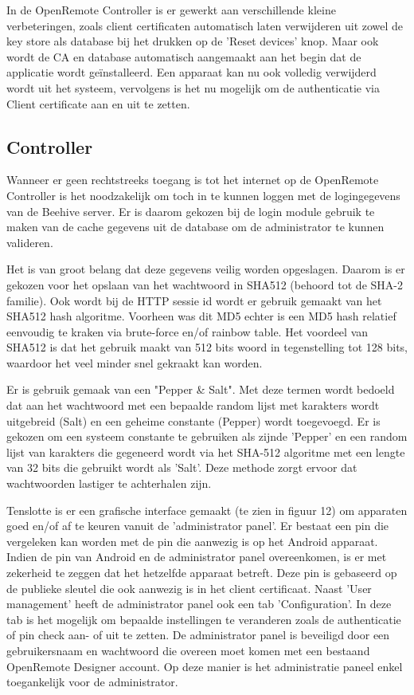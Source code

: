 \documentclass[]{article}
\begin{document}
In de OpenRemote Controller is er gewerkt aan verschillende kleine
verbeteringen, zoals client certificaten automatisch laten verwijderen uit zowel
de key store als database bij het drukken op de 'Reset devices' knop. Maar ook
wordt de CA en database automatisch aangemaakt aan het begin dat de applicatie
wordt ge\"installeerd.  Een apparaat kan nu ook volledig verwijderd wordt uit het
systeem, vervolgens is het nu mogelijk om de authenticatie via Client
certificate aan en uit te zetten. 

\subsection{Controller}
Wanneer er geen rechtstreeks toegang is tot het internet op de 
OpenRemote Controller is het noodzakelijk om toch in te kunnen loggen met de
logingegevens van de Beehive server. Er is daarom gekozen bij de login module
gebruik te maken van de cache gegevens uit de database om de administrator te
kunnen valideren.

Het is van groot belang dat deze gegevens veilig worden opgeslagen. Daarom is er
gekozen voor het opslaan van het wachtwoord in SHA512 (behoord tot de SHA-2
familie). Ook wordt bij de HTTP sessie id  wordt er gebruik gemaakt van het SHA512
hash algoritme. Voorheen was dit MD5 echter is een MD5 hash relatief
eenvoudig te kraken via brute-force en/of rainbow table. Het voordeel van SHA512
is dat het gebruik maakt van 512 bits woord in tegenstelling tot 128
bits, waardoor het veel minder snel gekraakt kan worden.

Er is gebruik gemaak van een "Pepper \& Salt". Met deze termen wordt bedoeld dat
aan het wachtwoord met een bepaalde random lijst met karakters wordt uitgebreid
(Salt) en een geheime constante (Pepper) wordt toegevoegd. Er is gekozen om een
systeem constante te gebruiken als zijnde 'Pepper' en een random lijst van
karakters die gegeneerd wordt via het SHA-512 algoritme met een lengte van 32
bits die gebruikt wordt als 'Salt'. Deze methode zorgt ervoor dat wachtwoorden
lastiger te achterhalen zijn. 

Tenslotte is er een grafische interface gemaakt (te zien in figuur 12) om
apparaten goed en/of af te keuren vanuit de 'administrator panel'. Er bestaat
een pin die vergeleken kan worden met de pin die aanwezig is op het Android
apparaat. Indien de pin van Android en de administrator panel overeenkomen, is
er met zekerheid te zeggen dat het hetzelfde apparaat betreft. Deze pin is
gebaseerd op de publieke sleutel die ook aanwezig is in het client certificaat.
Naast 'User management' heeft de administrator panel ook een tab
'Configuration'. In deze tab is het mogelijk om bepaalde instellingen te
veranderen zoals de authenticatie of pin check aan- of uit te zetten.  De
administrator panel is beveiligd door een gebruikersnaam en wachtwoord die
overeen moet komen met een bestaand OpenRemote Designer account. Op deze manier
is het administratie paneel enkel toegankelijk voor de administrator.
\end{document}
